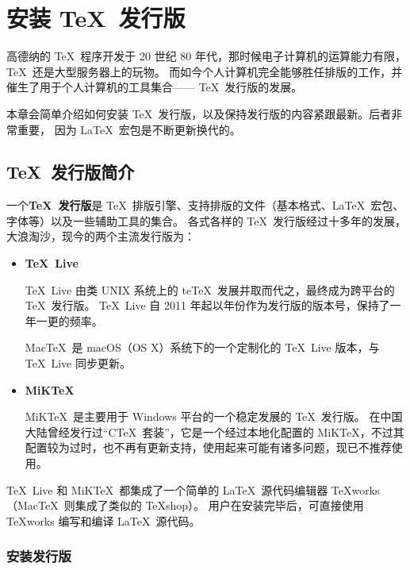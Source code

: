 \chapter{安装 \protect\TeX\ 发行版}\label{app:install}

\begin{intro}
高德纳的 \TeX\ 程序开发于 20 世纪 80 年代，那时候电子计算机的运算能力有限，\TeX\ 还是大型服务器上的玩物。
而如今个人计算机完全能够胜任排版的工作，并催生了用于个人计算机的工具集合—— \TeX\ 发行版的发展。

本章会简单介绍如何安装 \TeX\ 发行版，以及保持发行版的内容紧跟最新。后者非常重要，
因为 \LaTeX\ 宏包是不断更新换代的。
\end{intro}

\section{\protect\TeX\ 发行版简介}\label{sec:dists}

一个\textbf{\TeX\ 发行版}是 \TeX\ 排版引擎、支持排版的文件（基本格式、\LaTeX\ 宏包、字体等）以及一些辅助工具的集合。
各式各样的 \TeX\ 发行版经过十多年的发展，大浪淘沙，现今的两个主流发行版为：
\begin{itemize}
  \item \textbf{\TeX\ Live}\par
  \TeX\ Live 由类 UNIX 系统上的 te\TeX\ 发展并取而代之，最终成为跨平台的 \TeX\ 发行版。
  \TeX\ Live 自 2011 年起以年份作为发行版的版本号，保持了一年一更的频率。

  Mac\TeX\ 是 macOS（OS X）系统下的一个定制化的 \TeX\ Live 版本，与 \TeX\ Live 同步更新。

  \item \textbf{MiK\TeX}\par
  MiK\TeX\ 是主要用于 Windows 平台的一个稳定发展的 \TeX\ 发行版。
  在中国大陆曾经发行过“C\TeX\ 套装”，它是一个经过本地化配置的 MiK\TeX ，不过其配置较为过时，也不再有更新支持，使用起来可能有诸多问题，现已不推荐使用。
\end{itemize}

\TeX\ Live 和 MiK\TeX\ 都集成了一个简单的 \LaTeX\ 源代码编辑器 \TeX works（Mac\TeX\ 则集成了类似的 \TeX shop）。
用户在安装完毕后，可直接使用 \TeX works 编写和编译 \LaTeX\ 源代码。

\subsection{安装发行版}\label{subsec:install-dists}

